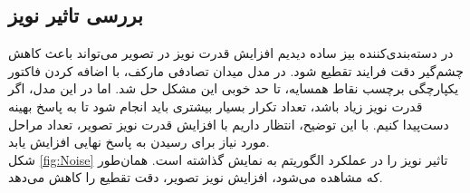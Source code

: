 \documentclass[11.5pt,a4paper]{article}
\begin{document}
\subsection{بررسی تاثیر نویز}
در دسته‌بندی‌کننده بیز ساده دیدیم افزایش قدرت نویز در تصویر می‌تواند باعث کاهش چشم‌گیر دقت فرایند تقطیع شود. در مدل میدان تصادفی مارکف، با اضافه کردن فاکتور یکپارچگی برچسب نقاط همسایه، تا حد خوبی این مشکل حل شد. اما در این مدل، اگر قدرت نویز زیاد باشد، تعداد تکرار بسیار بیشتری باید انجام شود تا به پاسخ بهینه دست‌پیدا کنیم. با این توضیح، انتظار داریم با افزایش قدرت نویز تصویر، تعداد مراحل مورد نیاز برای رسیدن به پاسخ نهایی افزایش یابد.
\\
شکل
\ref{fig:Noise}
تاثیر نویز را در عملکرد الگوریتم به نمایش گذاشته است. همان‌طور که مشاهده می‌شود، افزایش نویز تصویر، دقت تقطیع را کاهش می‌دهد.
\end{document}
